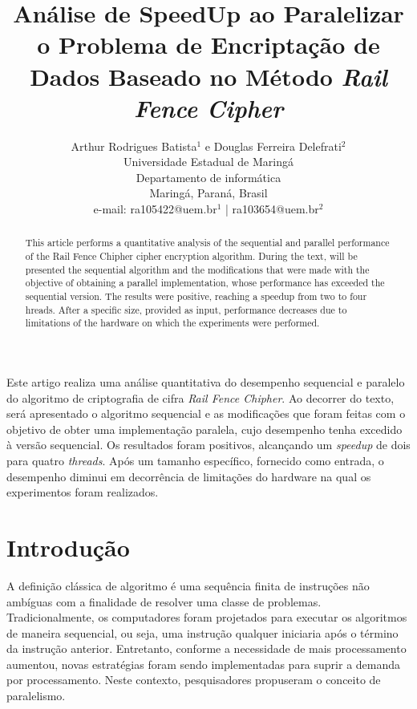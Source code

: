 \documentclass[letterpaper, 10 pt, conference]{ieeeconf}  %
\title{\LARGE \bf
Análise de SpeedUp ao Paralelizar o Problema de Encriptação de Dados Baseado no Método \textit{Rail Fence Cipher}
}
\author{Arthur Rodrigues Batista$^{1}$ e Douglas Ferreira Delefrati$^{2}$%
 \\Universidade Estadual de Maringá\\
   Departamento de informática\\
   Maringá, Paraná, Brasil
 \\ e-mail: ra105422@uem.br$^{1}$ | ra103654@uem.br$^{2}$
}
\begin{document}
\maketitle
\thispagestyle{empty}
\pagestyle{empty}


\begin{abstract}

This article performs a quantitative analysis of the sequential and parallel performance of the Rail Fence Chipher cipher encryption algorithm. During the text, will be presented the sequential algorithm and the modifications that were made with the objective of obtaining a parallel implementation, whose performance has exceeded the sequential version. The results were positive, reaching a speedup from two to four hreads. After a specific size, provided as input, performance decreases due to limitations of the hardware on which the experiments were performed.

\end{abstract}

\begin{resumo}

Este artigo realiza uma análise quantitativa do desempenho sequencial e paralelo do algoritmo de criptografia de cifra \textit{Rail Fence Chipher}. Ao decorrer do texto, será apresentado o algoritmo sequencial e as modificações que foram feitas com o objetivo de obter uma implementação paralela, cujo desempenho tenha excedido à versão sequencial. Os resultados foram positivos, alcançando um \textit{speedup} de dois para quatro \textit{threads}. Após um tamanho específico, fornecido como entrada, o desempenho diminui em decorrência de limitações do hardware na qual os experimentos foram realizados.

\end{resumo}


\section{Introdução}
A definição clássica de algoritmo é uma sequência finita de instruções não ambíguas com a finalidade de resolver uma classe de problemas. Tradicionalmente, os computadores foram projetados para executar os algoritmos de maneira sequencial, ou seja, uma instrução qualquer iniciaria após o término da instrução anterior. Entretanto, conforme a necessidade de mais processamento aumentou, novas estratégias foram sendo implementadas para suprir a demanda por processamento. Neste contexto, pesquisadores propuseram o conceito de paralelismo.
\end{document}
